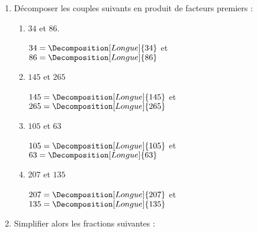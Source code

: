 \begin{corrige}
    \begin{enumerate}
        \item Décomposer les couples suivants en produit de facteurs premiers :
        
        \begin{enumerate}
            \item $34$ et $86$.
            
            {\red $34 = \Decomposition[Longue]{34}$ et $86 = \Decomposition[Longue]{86}$}
            \item $145$ et $265$
            
            {\red $145 = \Decomposition[Longue]{145}$ et $265 = \Decomposition[Longue]{265}$}
            \item $105$ et $63$
            
            {\red $105 = \Decomposition[Longue]{105}$ et $63 = \Decomposition[Longue]{63}$}
            \item $207$ et $135$
            
            {\red $207 = \Decomposition[Longue]{207}$ et $135 = \Decomposition[Longue]{135}$}
        \end{enumerate}
        \setcounter{enumi}{1}
        \item Simplifier alors les fractions suivantes :
        
        \begin{enumerate}
        \end{enumerate}        
    \end{enumerate}
\end{corrige}

